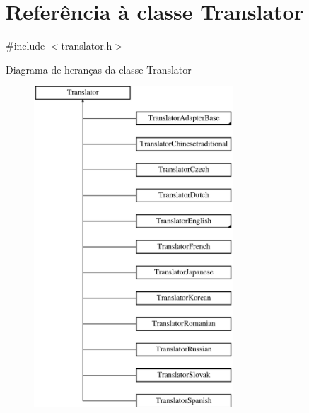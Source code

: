 \hypertarget{class_translator}{\section{Referência à classe Translator}
\label{class_translator}
}


{\ttfamily \#include $<$translator.\-h$>$}

Diagrama de heranças da classe Translator\begin{figure}[H]
\begin{center}
\leavevmode
\includegraphics[height=12.000000cm]{class_translator}
\end{center}
\end{figure}
